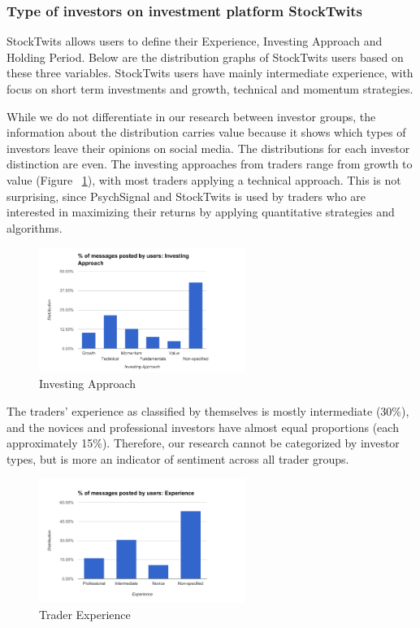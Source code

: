\subsubsection{Type of investors on investment platform StockTwits}
StockTwits allows users to define their Experience, Investing Approach and Holding Period. Below are the distribution graphs of StockTwits users based on these three variables. StockTwits users have mainly intermediate experience, with focus on short term investments and growth, technical and momentum strategies.
\par
While we do not differentiate in our research between investor groups, the information about the distribution carries value because it shows which types of investors leave their opinions on social media. The distributions for each investor distinction are even. The investing approaches from traders range from growth to value (Figure ~\ref{fig:figure4}), with most traders applying a technical approach. This is not surprising, since PsychSignal and StockTwits is used by traders who are interested in maximizing their returns by applying quantitative strategies and algorithms. 

\begin{figure}[ht]
\centering
\includegraphics[width=0.6\textwidth]{figures/figure4.png}
\caption{\label{fig:figure4}Investing Approach}
\end{figure}

The traders' experience as classified by themselves is mostly intermediate (30\%), and the novices and professional investors have almost equal proportions (each approximately 15\%). Therefore, our research cannot be categorized by investor types, but is more an indicator of sentiment across all trader groups.

\begin{figure}[ht]
\centering
\includegraphics[width=0.6\textwidth]{figures/figure5.png}
\caption{\label{fig:figure5}Trader Experience}
\end{figure}

